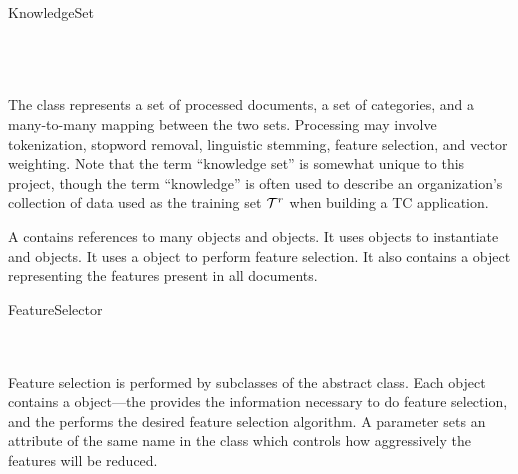 \begin{description}

\item
\begin{concreteclass}{KnowledgeSet}
 \attributes
   \\
   \\
 \methods
   \\
   \\
\end{concreteclass}

The  class represents a set of processed documents, a set
of categories, and a many-to-many mapping between the two sets.
Processing may involve tokenization, stopword removal, linguistic
stemming, feature selection, and vector weighting.  Note that the term
``knowledge set'' is somewhat unique to this project, though the term
``knowledge'' is often used to describe an organization's collection
of data used as the training set $\mathcal{T}^r$ when building a TC
application.

A  contains references to many  objects and
 objects.  It uses  objects to instantiate 
and  objects.  It uses a  object to perform
feature selection.  It also contains a  object
representing the features present in all documents.

\item
\begin{abstractclass}{FeatureSelector}
 \attributes
 \methods
   \\
   \\
   \\
\end{abstractclass}

Feature selection is performed by subclasses of the abstract 
class.  Each  object contains a 
object---the  provides the information necessary to do
feature selection, and the  performs the desired
feature selection algorithm.  A  parameter
sets an attribute of the same name in the 
class which controls how aggressively the features will be reduced.


\end{description}
